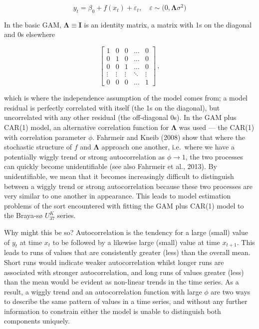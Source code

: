\documentclass[12pt,]{article}
\newcommand{\uk}{\ensuremath{\mathit{U}^{\mathit{K}}_{\mathup{37}}}}
\begin{document}
\begin{equation}
y_t = \beta_0 + f(x_t) + \varepsilon_t, \quad \varepsilon \sim \mathcal(0, \boldsymbol{\Lambda}\sigma^2)
\end{equation}

In the basic GAM, \(\boldsymbol{\Lambda} \equiv \mathbf{I}\) is an
identity matrix, a matrix with 1s on the diagonal and 0s elsewhere

\begin{equation*}
\begin{bmatrix}
1      & 0 & 0 & \dots & 0 \\
0      & 1 & 0 & \dots & 0 \\
0      & 0 & 1 & \dots & 0 \\
\vdots & \vdots & \vdots & \ddots & \vdots \\
0      & 0 & 0 & \dots & 1
\end{bmatrix}\, ,
\end{equation*}

which is where the independence assumption of the model comes from; a
model residual is perfectly correlated with itself (the 1s on the
diagonal), but uncorrelated with any other residual (the off-diagonal
0s). In the GAM plus CAR(1) model, an alternative correlation function
for \(\boldsymbol{\Lambda}\) was used --- the CAR(1) with correlation
parameter \(\phi\). Fahrmeir and Kneib (2008) show that where the
stochastic structure of \(f\) and \(\boldsymbol{\Lambda}\) approach one
another, i.e.~where we have a potentially wiggly trend or strong
autocorrelation as \(\phi \rightarrow 1\), the two processes can quickly
become unidentifiable (see also Fahrmeir et al., 2013). By
unidentifiable, we mean that it becomes increasingly difficult to
distinguish between a wiggly trend or strong autocorrelation because
these two processes are very similar to one another in appearance. This
leads to model estimation problems of the sort encountered with fitting
the GAM plus CAR(1) model to the Braya-sø \uk{} series.

Why might this be so? Autocorrelation is the tendency for a large
(small) value of \(y_t\) at time \(x_t\) to be followed by a likewise
large (small) value at time \(x_{t+1}\). This leads to runs of values
that are consistently greater (less) than the overall mean. Short runs
would indicate weaker autocorrelation whilst longer runs are associated
with stronger autocorrelation, and long runs of values greater (less)
than the mean would be evident as non-linear trends in the time series.
As a result, a wiggly trend and an autocorrelation function with large
\(\phi\) are two ways to describe the same pattern of values in a time
series, and without any further information to constrain either the
model is unable to distinguish both components uniquely.
\end{document}
